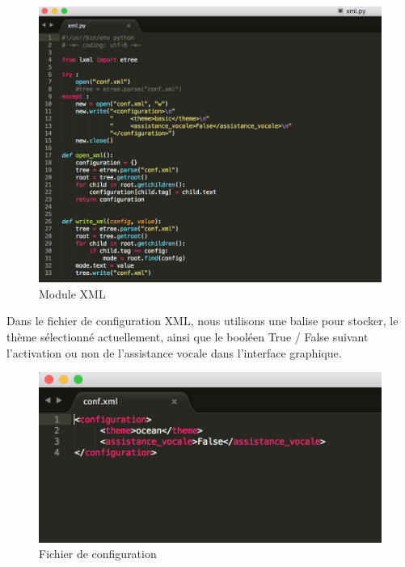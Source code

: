 \documentclass[a4paper,12pt]{article}
\begin{document}
\begin{figure}[h!] 
			\begin{center}
				\includegraphics[scale=0.47]{images/xml.png}
				\caption{Module XML}
			\end{center}
		\end{figure}

\newpage
		
Dans le fichier de configuration XML, nous utilisons une balise pour stocker, le thème sélectionné actuellement, ainsi que le booléen True / False suivant l'activation ou non de l'assistance vocale dans l'interface graphique.
		
\begin{figure}[h!]
			\begin{center}
				\includegraphics[scale=0.6]{images/conf.png}
				\caption{Fichier de configuration}
			\end{center}
		\end{figure}
\end{document}
